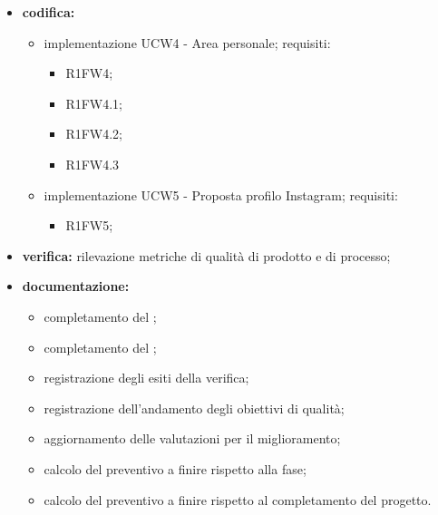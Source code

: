 \begin{itemize}
	\item \textbf{codifica:} 
			\begin{itemize}
				\item implementazione UCW4 - Area personale; requisiti:
					\begin{itemize}
						\item R1FW4;
      					\item R1FW4.1;
           				\item R1FW4.2;
               			\item R1FW4.3
					\end{itemize}
				\item implementazione UCW5 - Proposta profilo Instagram; requisiti:
					\begin{itemize}
						\item R1FW5;
					\end{itemize}
			\end{itemize}
 	\item \textbf{verifica:} rilevazione metriche di qualità di prodotto e di processo;
	\item \textbf{documentazione:} 
	 \begin{itemize}
		\item completamento del \MU{};
		\item completamento del \MS{};
  		\item registrazione degli esiti della verifica;
     	\item registrazione dell’andamento degli obiettivi di qualità;
		\item aggiornamento delle valutazioni per il miglioramento; 
		\item calcolo del preventivo a finire rispetto alla fase;
		\item calcolo del preventivo a finire rispetto al completamento del progetto.
	 \end{itemize}
\end{itemize}

\pagebreak

